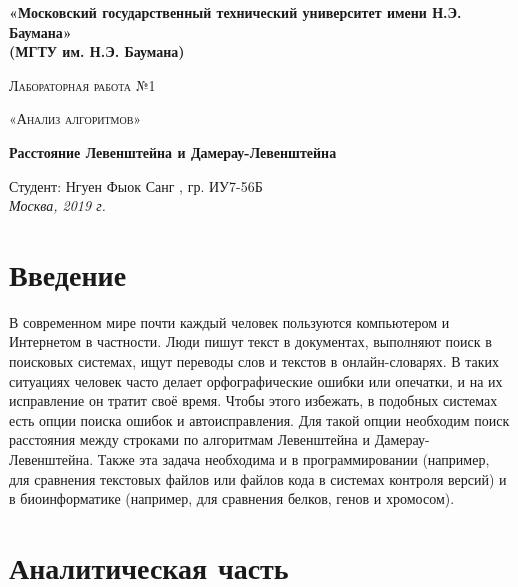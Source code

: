 \documentclass[12pt, a4paper]{report}
\begin{document}
    \begin{titlepage}

        \begin{center}
            \Large
            {\bf«Московский государственный технический университет имени Н.Э. Баумана»\\
				(МГТУ им. Н.Э. Баумана)}
            \vspace{3cm}

			{\scshape\LARGE Лабораторная работа №1 \par}
			\vspace{0.3cm}	
			{\scshape\LARGE «Анализ алгоритмов» \par}
			\vspace{1.5cm}
			{\huge\bfseries Расстояние Левенштейна и Дамерау-Левенштейна \par}
			\vspace{2cm}
			\Large Студент: Нгуен Фыок Санг , гр. ИУ7-56Б\\
		
			\vfill
			\Large \textit {Москва, 2019 г.}
            
        \end{center}

    \end{titlepage}
	
	\tableofcontents
	
	\chapter*{Введение}
	
	В современном мире почти каждый человек пользуются компьютером и Интернетом в частности. Люди пишут текст в документах, выполняют поиск в поисковых системах, ищут переводы слов и текстов в онлайн-словарях. В таких ситуациях человек часто делает орфографические ошибки или опечатки, и на их исправление он тратит своё время. Чтобы этого избежать, в подобных системах есть опции поиска ошибок и автоисправления. Для такой опции необходим поиск расстояния между строками по алгоритмам Левенштейна и Дамерау-Левенштейна. Также эта задача необходима и в программировании (например, для сравнения текстовых файлов или файлов кода в системах контроля версий) и в биоинформатике (например, для сравнения белков, генов и хромосом).

    \chapter{Аналитическая часть}
\end{document}
